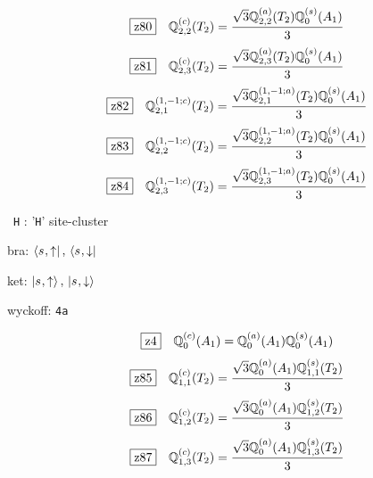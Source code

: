 \documentclass[fleqn,10pt,landscape]{jsarticle}
\begin{document}
\begin{dmath*}
\hspace*{3mm}\fbox{z80}\quad \mathbb{Q}_{2,2}^{(c)}(T_{2})=\frac{\sqrt{3} \mathbb{Q}_{2,2}^{(a)}(T_{2}) \mathbb{Q}_{0}^{(s)}(A_{1})}{3}
\end{dmath*}
\begin{dmath*}
\hspace*{3mm}\fbox{z81}\quad \mathbb{Q}_{2,3}^{(c)}(T_{2})=\frac{\sqrt{3} \mathbb{Q}_{2,3}^{(a)}(T_{2}) \mathbb{Q}_{0}^{(s)}(A_{1})}{3}
\end{dmath*}
\begin{dmath*}
\hspace*{3mm}\fbox{z82}\quad \mathbb{Q}_{2,1}^{(1,-1;c)}(T_{2})=\frac{\sqrt{3} \mathbb{Q}_{2,1}^{(1,-1;a)}(T_{2}) \mathbb{Q}_{0}^{(s)}(A_{1})}{3}
\end{dmath*}
\begin{dmath*}
\hspace*{3mm}\fbox{z83}\quad \mathbb{Q}_{2,2}^{(1,-1;c)}(T_{2})=\frac{\sqrt{3} \mathbb{Q}_{2,2}^{(1,-1;a)}(T_{2}) \mathbb{Q}_{0}^{(s)}(A_{1})}{3}
\end{dmath*}
\begin{dmath*}
\hspace*{3mm}\fbox{z84}\quad \mathbb{Q}_{2,3}^{(1,-1;c)}(T_{2})=\frac{\sqrt{3} \mathbb{Q}_{2,3}^{(1,-1;a)}(T_{2}) \mathbb{Q}_{0}^{(s)}(A_{1})}{3}
\end{dmath*}
\vspace{5mm}

\noindent\textbullet\, \texttt{H} : '\texttt{H}' site-cluster

\noindent\quad * bra: $\bra{s_{},\uparrow},\, \bra{s_{},\downarrow}$

\noindent\quad * ket: $\ket{s_{},\uparrow},\, \ket{s_{},\downarrow}$

\noindent\quad * wyckoff: \texttt{4a}

\begin{dmath*}
\hspace*{3mm}\fbox{z4}\quad \mathbb{Q}_{0}^{(c)}(A_{1})=\mathbb{Q}_{0}^{(a)}(A_{1}) \mathbb{Q}_{0}^{(s)}(A_{1})
\end{dmath*}
\begin{dmath*}
\hspace*{3mm}\fbox{z85}\quad \mathbb{Q}_{1,1}^{(c)}(T_{2})=\frac{\sqrt{3} \mathbb{Q}_{0}^{(a)}(A_{1}) \mathbb{Q}_{1,1}^{(s)}(T_{2})}{3}
\end{dmath*}
\begin{dmath*}
\hspace*{3mm}\fbox{z86}\quad \mathbb{Q}_{1,2}^{(c)}(T_{2})=\frac{\sqrt{3} \mathbb{Q}_{0}^{(a)}(A_{1}) \mathbb{Q}_{1,2}^{(s)}(T_{2})}{3}
\end{dmath*}
\begin{dmath*}
\hspace*{3mm}\fbox{z87}\quad \mathbb{Q}_{1,3}^{(c)}(T_{2})=\frac{\sqrt{3} \mathbb{Q}_{0}^{(a)}(A_{1}) \mathbb{Q}_{1,3}^{(s)}(T_{2})}{3}
\end{dmath*}
\vspace{5mm}
\end{document}
